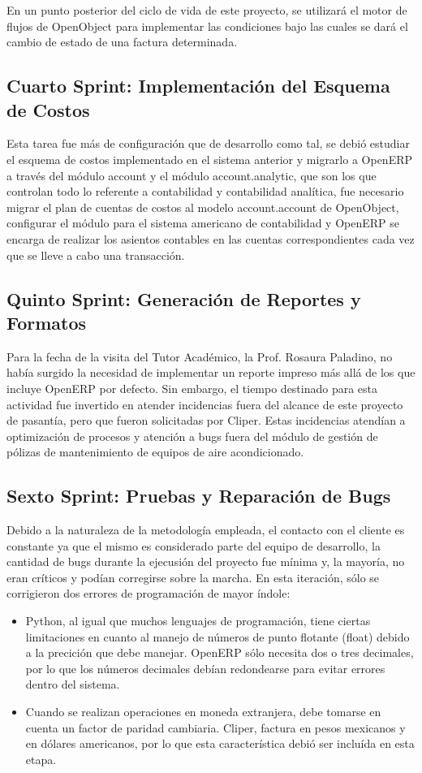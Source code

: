 \documentclass[a4paper, 12pt]{article}
\begin{document}
En un punto posterior del ciclo de vida de este proyecto, se utilizará el motor de flujos de OpenObject para implementar las condiciones bajo las cuales se dará el cambio de estado de una factura determinada.

\subsection{Cuarto Sprint: Implementación del Esquema de Costos}
Esta tarea fue más de configuración que de desarrollo como tal, se debió estudiar el esquema de costos implementado en el sistema anterior y migrarlo a OpenERP a través del módulo account y el módulo account.analytic, que son los que controlan todo lo referente a contabilidad y contabilidad analítica, fue necesario migrar el plan de cuentas de costos al modelo account.account de OpenObject, configurar el módulo para el sistema americano de contabilidad y OpenERP se encarga de realizar los asientos contables en las cuentas correspondientes cada vez que se lleve a cabo una transacción.

\subsection{Quinto Sprint: Generación de Reportes y Formatos}
Para la fecha de la visita del Tutor Académico, la Prof. Rosaura Paladino, no había surgido la necesidad de implementar un reporte impreso más allá de los que incluye OpenERP por defecto. Sin embargo, el tiempo destinado para esta actividad fue invertido en atender incidencias fuera del alcance de este proyecto de pasantía, pero que fueron solicitadas por Cliper. Estas incidencias atendían a optimización de procesos y atención a bugs fuera del módulo de gestión de pólizas de mantenimiento de equipos de aire acondicionado.

\subsection{Sexto Sprint: Pruebas y Reparación de Bugs}
Debido a la naturaleza de la metodología empleada, el contacto con el cliente es constante ya que el mismo es considerado parte del equipo de desarrollo, la cantidad de bugs durante la ejecusión del proyecto fue mínima y, la mayoría, no eran críticos y podían corregirse sobre la marcha. En esta iteración, sólo se corrigieron dos errores de programación de mayor índole:
\begin{itemize}
    \item Python, al igual que muchos lenguajes de programación, tiene ciertas limitaciones en cuanto al manejo de números de punto flotante (float) debido a la precición que debe manejar. OpenERP sólo necesita dos o tres decimales, por lo que los números decimales debían redondearse para evitar errores dentro del sistema.
    \item Cuando se realizan operaciones en moneda extranjera, debe tomarse en cuenta un factor de paridad cambiaria. Cliper, factura en pesos mexicanos y en dólares americanos, por lo que esta característica debió ser incluída en esta etapa.
\end{itemize}
\end{document}
